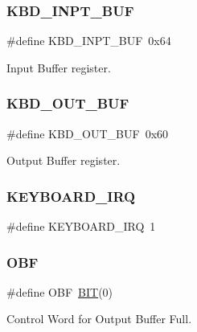 \subsubsection{\texorpdfstring{K\+B\+D\+\_\+\+I\+N\+P\+T\+\_\+\+B\+UF}{KBD\_INPT\_BUF}}
{\footnotesize\ttfamily \#define K\+B\+D\+\_\+\+I\+N\+P\+T\+\_\+\+B\+UF~0x64}



Input Buffer register. 

\hypertarget{group__i8042_gaeff3162e464a9081f73e3765f199d7c1}{}\label{group__i8042_gaeff3162e464a9081f73e3765f199d7c1} 
\subsubsection{\texorpdfstring{K\+B\+D\+\_\+\+O\+U\+T\+\_\+\+B\+UF}{KBD\_OUT\_BUF}}
{\footnotesize\ttfamily \#define K\+B\+D\+\_\+\+O\+U\+T\+\_\+\+B\+UF~0x60}



Output Buffer register. 

\hypertarget{group__i8042_ga2d17911b50c0aeebb2e3325c5b36d4f2}{}\label{group__i8042_ga2d17911b50c0aeebb2e3325c5b36d4f2} 
\subsubsection{\texorpdfstring{K\+E\+Y\+B\+O\+A\+R\+D\+\_\+\+I\+RQ}{KEYBOARD\_IRQ}}
{\footnotesize\ttfamily \#define K\+E\+Y\+B\+O\+A\+R\+D\+\_\+\+I\+RQ~1}

\hypertarget{group__i8042_ga45967c9e25447ba853cf6fb4ac545fe6}{}\label{group__i8042_ga45967c9e25447ba853cf6fb4ac545fe6} 
\subsubsection{\texorpdfstring{O\+BF}{OBF}}
{\footnotesize\ttfamily \#define O\+BF~\hyperlink{tools_8h_a3a8ea58898cb58fc96013383d39f482c}{B\+IT}(0)}



Control Word for Output Buffer Full. 

\hypertarget{group__i8042_ga307ab71673e26ec42b28a3bca05d4cb5}{}\label{group__i8042_ga307ab71673e26ec42b28a3bca05d4cb5} 
